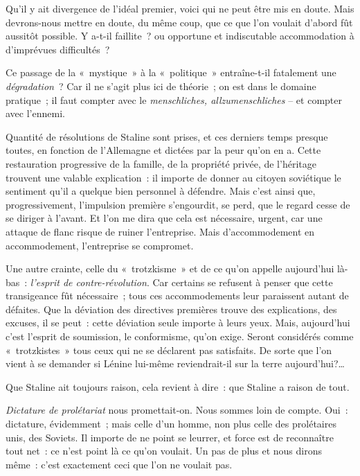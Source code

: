 \documentclass[french,twoside]{book} %
\newcommand{\astermono}{\medskip\centerline{\color{rubric}\large\selectfont{\syms ✻}}\medskip\par}%
\begin{document}
\noindent Qu’il y ait divergence de l’idéal premier, voici qui ne peut être mis en doute. Mais devrons-nous mettre en doute, du même coup, que ce que l’on voulait d’abord fût aussitôt possible. Y a-t-il faillite ? ou opportune et indiscutable accommodation à d’imprévues difficultés ?\par
Ce passage de la « mystique » à la « politique » entraîne-t-il fatalement une \emph{dégradation} ? Car il ne s’agit plus ici de théorie ; on est dans le domaine pratique ; il faut compter avec le \emph{menschliches, allzumenschliches} – et compter avec l’ennemi.\par
Quantité de résolutions de Staline sont prises, et ces derniers temps presque toutes, en fonction de l’Allemagne et dictées par la peur qu’on en a. Cette restauration progressive de la famille, de la propriété privée, de l’héritage trouvent une valable explication : il importe de donner au citoyen soviétique le sentiment qu’il a quelque bien personnel à défendre. Mais c’est ainsi que, progressivement, l’impulsion première s’engourdit, se perd, que le regard cesse de se diriger à l’avant. Et l’on me dira que cela est nécessaire, urgent, car une attaque de flanc risque de ruiner l’entreprise. Mais d’accommodement en accommodement, l’entreprise se compromet.\par
Une autre crainte, celle du « trotzkisme » et de ce qu’on appelle aujourd’hui là-bas : \emph{l’esprit de contre-révolution}. Car certains se refusent à penser que cette transigeance fût nécessaire ; tous ces accommodements leur paraissent autant de défaites. Que la déviation des directives premières trouve des explications, des excuses, il se peut : cette déviation seule importe à leurs yeux. Mais, aujourd’hui c’est l’esprit de soumission, le conformisme, qu’on exige. Seront considérés comme « trotzkistes » tous ceux qui ne se déclarent pas satisfaits. De sorte que l’on vient à se demander si Lénine lui-même reviendrait-il sur la terre aujourd’hui?…\par

\astermono

\noindent Que Staline ait toujours raison, cela revient à dire : que Staline a raison de tout.\par

\astermono

\noindent \emph{Dictature de prolétariat} nous promettait-on. Nous sommes loin de compte. Oui : dictature, évidemment ; mais celle d’un homme, non plus celle des prolétaires unis, des Soviets. Il importe de ne point se leurrer, et force est de reconnaître tout net : ce n’est point là ce qu’on voulait. Un pas de plus et nous dirons même : c’est exactement ceci que l’on ne voulait pas.\par
\end{document}
